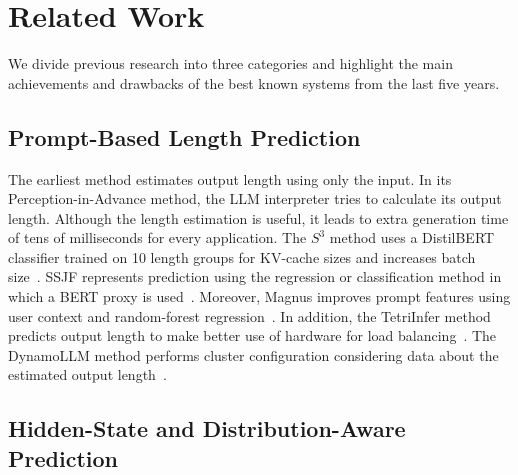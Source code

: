 \documentclass[conference]{IEEEtran}
\begin{document}
\clearpage
\section{Related Work}
We divide previous research into three categories and highlight the main achievements and drawbacks of the best known systems from the last five years.

\subsection{Prompt-Based Length Prediction}\label{AA}
The earliest method estimates output length using only the input. In its Perception-in-Advance method, the LLM interpreter tries to calculate its output length. Although the length estimation is useful, it leads to extra generation time of tens of milliseconds for every application. The $S^3$ method uses a DistilBERT classifier trained on 10 length groups for KV-cache sizes and increases batch size~\cite{jin2023s3}. SSJF represents prediction using the regression or classification method in which a BERT proxy is used~\cite{qiu2024ssjf}. Moreover, Magnus improves prompt features using user context and random-forest regression~\cite{cheng2024magnus}. In addition, the TetriInfer method predicts output length to make better use of hardware for load balancing~\cite{hu2024tetriinfer}. The DynamoLLM method performs cluster configuration considering data about the estimated output length~\cite{stojkovic2024dynamollm}.

\subsection{Hidden-State and Distribution-Aware Prediction}
\end{document}
